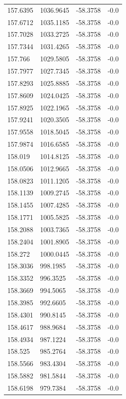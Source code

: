 \begin{table}[H]
\begin{tabular}{llll}
157.6395 & 1036.9645 & -58.3758 & -0.0 \\
157.6712 & 1035.1185 & -58.3758 & -0.0 \\
157.7028 & 1033.2725 & -58.3758 & -0.0 \\
157.7344 & 1031.4265 & -58.3758 & -0.0 \\
157.766 & 1029.5805 & -58.3758 & -0.0 \\
157.7977 & 1027.7345 & -58.3758 & -0.0 \\
157.8293 & 1025.8885 & -58.3758 & -0.0 \\
157.8609 & 1024.0425 & -58.3758 & -0.0 \\
157.8925 & 1022.1965 & -58.3758 & -0.0 \\
157.9241 & 1020.3505 & -58.3758 & -0.0 \\
157.9558 & 1018.5045 & -58.3758 & -0.0 \\
157.9874 & 1016.6585 & -58.3758 & -0.0 \\
158.019 & 1014.8125 & -58.3758 & -0.0 \\
158.0506 & 1012.9665 & -58.3758 & -0.0 \\
158.0823 & 1011.1205 & -58.3758 & -0.0 \\
158.1139 & 1009.2745 & -58.3758 & -0.0 \\
158.1455 & 1007.4285 & -58.3758 & -0.0 \\
158.1771 & 1005.5825 & -58.3758 & -0.0 \\
158.2088 & 1003.7365 & -58.3758 & -0.0 \\
158.2404 & 1001.8905 & -58.3758 & -0.0 \\
158.272 & 1000.0445 & -58.3758 & -0.0 \\
158.3036 & 998.1985 & -58.3758 & -0.0 \\
158.3352 & 996.3525 & -58.3758 & -0.0 \\
158.3669 & 994.5065 & -58.3758 & -0.0 \\
158.3985 & 992.6605 & -58.3758 & -0.0 \\
158.4301 & 990.8145 & -58.3758 & -0.0 \\
158.4617 & 988.9684 & -58.3758 & -0.0 \\
158.4934 & 987.1224 & -58.3758 & -0.0 \\
158.525 & 985.2764 & -58.3758 & -0.0 \\
158.5566 & 983.4304 & -58.3758 & -0.0 \\
158.5882 & 981.5844 & -58.3758 & -0.0 \\
158.6198 & 979.7384 & -58.3758 & -0.0 \\

\end{tabular}
\end{table}
